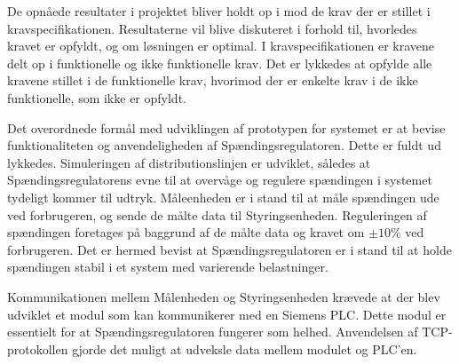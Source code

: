
De opnåede resultater i projektet bliver holdt op i mod de krav der er stillet i kravspecifikationen. Resultaterne vil blive diskuteret i forhold til, hvorledes kravet er opfyldt, og om løsningen er optimal. I kravspecifikationen er kravene delt op i funktionelle og ikke funktionelle krav. Det er lykkedes at opfylde alle kravene stillet i de funktionelle krav, hvorimod der er enkelte krav i de ikke funktionelle, som ikke er opfyldt. \newline

Det overordnede formål med udviklingen af prototypen for systemet er at bevise funktionaliteten og anvendeligheden af Spændingsregulatoren. Dette er fuldt ud lykkedes. Simuleringen af distributionslinjen er udviklet, således at Spændingsregulatorens evne til at overvåge og regulere spændingen i systemet tydeligt kommer til udtryk. Måleenheden er i stand til at måle spændingen ude ved forbrugeren, og sende de målte data til Styringsenheden. Reguleringen af spændingen foretages på baggrund af de målte data og kravet om $\pm10\%$ ved forbrugeren. Det er hermed bevist at Spændingsregulatoren er i stand til at holde spændingen stabil i et system med varierende belastninger. \newline

Kommunikationen mellem Målenheden og Styringsenheden krævede at der blev udviklet et modul som kan kommunikerer med en Siemens PLC. Dette modul er essentielt for at Spændingsregulatoren fungerer som helhed. Anvendelsen af TCP-protokollen gjorde det muligt at udveksle data mellem modulet og PLC'en. 
